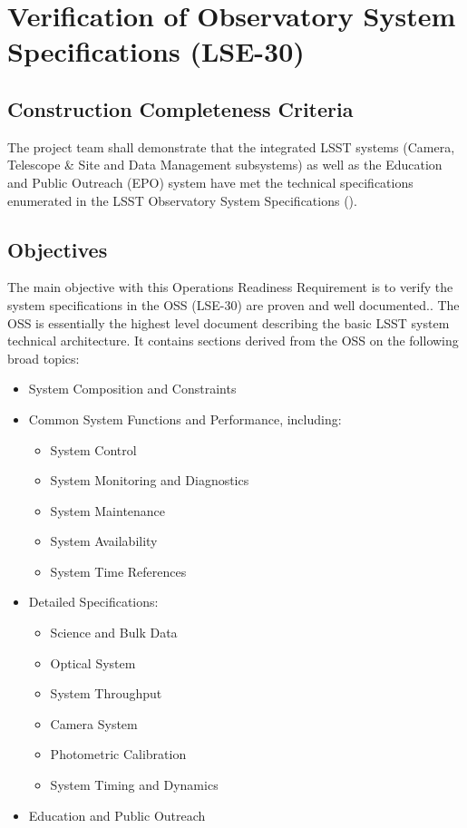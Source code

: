 \section{Verification of Observatory System Specifications (LSE-30)}  \label{sec:oss}

\subsection{Construction Completeness Criteria}
The project team shall demonstrate that the integrated LSST systems (Camera, Telescope \& Site and Data Management subsystems) as well as the Education and Public Outreach (EPO) system have met the technical specifications enumerated in the LSST Observatory System Specifications ().

\subsection{Objectives}

The main objective with this Operations Readiness Requirement is to verify the system specifications in the OSS (LSE-30) are proven and well documented..  The OSS is essentially the highest level document describing the basic LSST system technical architecture.  It contains sections derived from the OSS on the following broad topics:

\begin{itemize}
\item System Composition and Constraints

\item Common System Functions and Performance, including:

	\begin{itemize}
		\item System Control
		\item System Monitoring and Diagnostics
		\item System Maintenance
		\item System Availability
		\item System Time References
	\end{itemize}

\item Detailed Specifications:

	\begin{itemize}
		\item Science and Bulk Data
		\item Optical System
		\item System Throughput
		\item Camera System
		\item Photometric Calibration
		\item System Timing and Dynamics
	\end{itemize}
	
\item Education and Public Outreach

\end{itemize}


